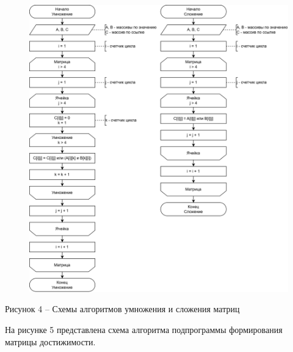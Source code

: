 \documentclass[a4paper,14pt]{extarticle}
\begin{document}
  \begin{figure}[h]
    \centering
    \includegraphics[width=1\linewidth]{images/s-3.png}
  \end{figure}
  \begin{center}
    Рисунок 4 – Схемы алгоритмов умножения и сложения матриц
  \end{center}

  \pagebreak
  На рисунке 5 представлена схема алгоритма подпрограммы формирования матрицы достижимости.
\end{document}
